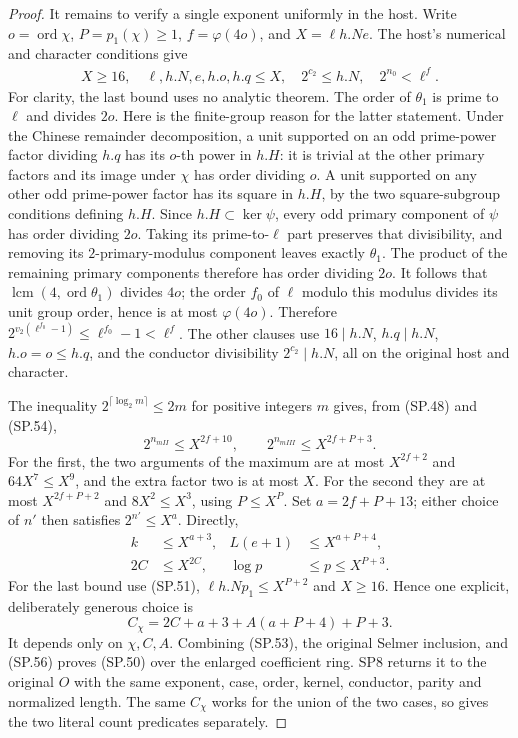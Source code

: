 \begin{proof}
It remains to verify a single exponent uniformly in the host.
Write $o=\operatorname{ord}\chi$, $P=p_{\!1}(\chi)\ge1$,
$f=\varphi(4o)$, and $X=\ell h.Ne$.  The host's numerical and
character conditions give
\[
 \begin{gathered}
 X\ge16,\quad \ell,h.N,e,h.o,h.q\le X,\quad
 2^{c_2}\le h.N,\quad 2^{n_0}<\ell^f. 
 \end{gathered}
 \tag{SP.54}
\]
For clarity, the last bound uses no analytic theorem.  The order
of $\theta_1$ is prime to $\ell$ and divides $2o$.
Here is the finite-group reason for the latter statement.
Under the Chinese remainder decomposition, a unit supported on an
odd prime-power factor dividing $h.q$ has its $o$-th power in
$h.H$: it is trivial at the other primary factors and its image
under $\chi$ has order dividing $o$.  A unit supported on any
other odd prime-power factor has its square in $h.H$, by the
two square-subgroup conditions defining $h.H$.  Since
$h.H\subset\ker\psi$, every odd primary component of $\psi$
has order dividing $2o$.  Taking its prime-to-$\ell$ part preserves
that divisibility, and removing its $2$-primary-modulus component
leaves exactly $\theta_1$.  The product of the remaining primary
components therefore has order dividing $2o$.
It follows that
$\operatorname{lcm}(4,\operatorname{ord}\theta_1)$ divides $4o$;
the order $f_0$ of $\ell$ modulo this modulus divides its unit
group order, hence is at most $\varphi(4o)$.  Therefore
$2^{v_2(\ell^{f_0}-1)}\le\ell^{f_0}-1<\ell^f$.
The other clauses use $16\mid h.N$, $h.q\mid h.N$,
$h.o=o\le h.q$, and the conductor divisibility
$2^{c_2}\mid h.N$, all on the original host and character.

The inequality $2^{\lceil\log_2 m\rceil}\le2m$ for positive
integers $m$ gives, from (SP.48) and (SP.54),
\[
 2^{n_{
m II}}\le X^{2f+10},\qquad
 2^{n_{
m III}}\le X^{2f+P+3}.
 \tag{SP.55}
\]
For the first, the two arguments of the maximum are at most
$X^{2f+2}$ and $64X^7\le X^9$, and the extra factor two is at
most $X$.  For the second they are at most $X^{2f+P+2}$ and
$8X^2\le X^3$, using $P\le X^P$.  Set $a=2f+P+13$; either
choice of $n'$ then satisfies $2^{n'}\le X^a$.  Directly,
\[
 \begin{aligned}
 k&\le X^{a+3},& L(e+1)&\le X^{a+P+4},\\
 2C&\le X^{2C},& \log p&\le p\le X^{P+3}.
 \end{aligned}
 \tag{SP.56}
\]
For the last bound use (SP.51), $\ell h.Np_1\le X^{P+2}$
and $X\ge16$.  Hence one explicit, deliberately generous choice is
\[
             C_\chi=2C+a+3+A(a+P+4)+P+3.
 \tag{SP.57}
\]
It depends only on $\chi,C,A$.  Combining (SP.53), the original
Selmer inclusion, and (SP.56) proves (SP.50) over the enlarged
coefficient ring.  SP8 returns it to the original $O$ with the
same exponent, case, order, kernel, conductor, parity and
normalized length.  The same $C_\chi$ works for the union of the
two cases, so gives the two literal count predicates separately.
\end{proof}

